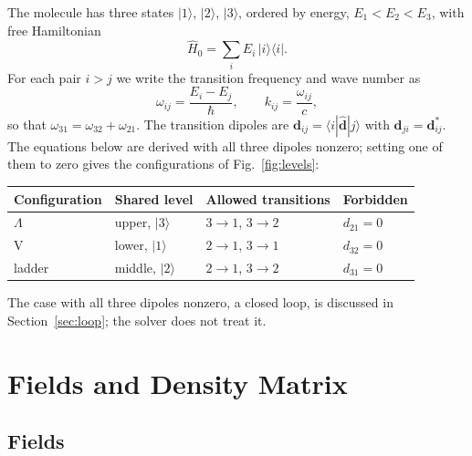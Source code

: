 \documentclass[12pt,a4paper]{article}
\begin{document}
The molecule has three states $|1\rangle$, $|2\rangle$, $|3\rangle$, ordered
by energy, $E_1 < E_2 < E_3$, with free Hamiltonian
\begin{equation}
  \hat{H}_0 = \sum_{i} E_i\,|i\rangle\langle i| .
\end{equation}
For each pair $i > j$ we write the transition frequency and wave number as
\begin{equation}
  \omega_{ij} = \frac{E_i - E_j}{\hbar}, \qquad k_{ij} = \frac{\omega_{ij}}{c},
\end{equation}
so that $\omega_{31} = \omega_{32} + \omega_{21}$. The transition dipoles
are $\bm{d}_{ij} = \langle i|\hat{\bm{d}}|j\rangle$ with
$\bm{d}_{ji} = \bm{d}_{ij}^*$. The equations below are derived with all three
dipoles nonzero; setting one of them to zero gives the configurations of
Fig.~\ref{fig:levels}:
\begin{center}
\begin{tabular}{@{}llll@{}}
  \toprule
  Configuration & Shared level & Allowed transitions & Forbidden \\
  \midrule
  $\Lambda$ & upper, $|3\rangle$  & $3\rightarrow1$, $3\rightarrow2$ & $d_{21} = 0$ \\
  V         & lower, $|1\rangle$  & $2\rightarrow1$, $3\rightarrow1$ & $d_{32} = 0$ \\
  ladder    & middle, $|2\rangle$ & $2\rightarrow1$, $3\rightarrow2$ & $d_{31} = 0$ \\
  \bottomrule
\end{tabular}
\end{center}
The case with all three dipoles nonzero, a closed loop, is discussed in
Section~\ref{sec:loop}; the solver does not treat it.

\section{Fields and Density Matrix}

\subsection{Fields}
\end{document}

